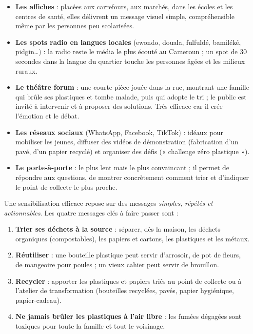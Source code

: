 \documentclass[11pt]{article}
\newcounter{popsec}
\newcounter{popsub}
\newcommand{\courssub}[1]{%
  \stepcounter{popsub}%
  \par\vspace{9pt}\noindent{\popxbold\fontsize{11.5}{13}\selectfont\color{popink}{\color{poporange}\thepopsec.\thepopsub}\hspace{6pt}#1}\par\nopagebreak\vspace{4pt}
}
\begin{document}
\begin{itemize}
\item \textbf{Les affiches} : placées aux carrefours, aux marchés, dans les écoles et les centres de santé, elles délivrent un message visuel simple, compréhensible même par les personnes peu scolarisées.
\item \textbf{Les spots radio en langues locales} (ewondo, douala, fulfuldé, bamiléké, pidgin\ldots) : la radio reste le média le plus écouté au Cameroun ; un spot de 30 secondes dans la langue du quartier touche les personnes âgées et les milieux ruraux.
\item \textbf{Le théâtre forum} : une courte pièce jouée dans la rue, montrant une famille qui brûle ses plastiques et tombe malade, puis qui adopte le tri ; le public est invité à intervenir et à proposer des solutions. Très efficace car il crée l'émotion et le débat.
\item \textbf{Les réseaux sociaux} (WhatsApp, Facebook, TikTok) : idéaux pour mobiliser les jeunes, diffuser des vidéos de démonstration (fabrication d'un pavé, d'un papier recyclé) et organiser des défis (« challenge zéro plastique »).
\item \textbf{Le porte-à-porte} : le plus lent mais le plus convaincant ; il permet de répondre aux questions, de montrer concrètement comment trier et d'indiquer le point de collecte le plus proche.
\end{itemize}

\courssub{Les messages clés et la règle des 3R}

Une sensibilisation efficace repose sur des messages \emph{simples, répétés et actionnables}. Les quatre messages clés à faire passer sont :

\begin{enumerate}
\item \textbf{Trier ses déchets à la source} : séparer, dès la maison, les déchets organiques (compostables), les papiers et cartons, les plastiques et les métaux.
\item \textbf{Réutiliser} : une bouteille plastique peut servir d'arrosoir, de pot de fleurs, de mangeoire pour poules ; un vieux cahier peut servir de brouillon.
\item \textbf{Recycler} : apporter les plastiques et papiers triés au point de collecte ou à l'atelier de transformation (bouteilles recyclées, pavés, papier hygiénique, papier-cadeau).
\item \textbf{Ne jamais brûler les plastiques à l'air libre} : les fumées dégagées sont toxiques pour toute la famille et tout le voisinage.
\end{enumerate}
\end{document}
